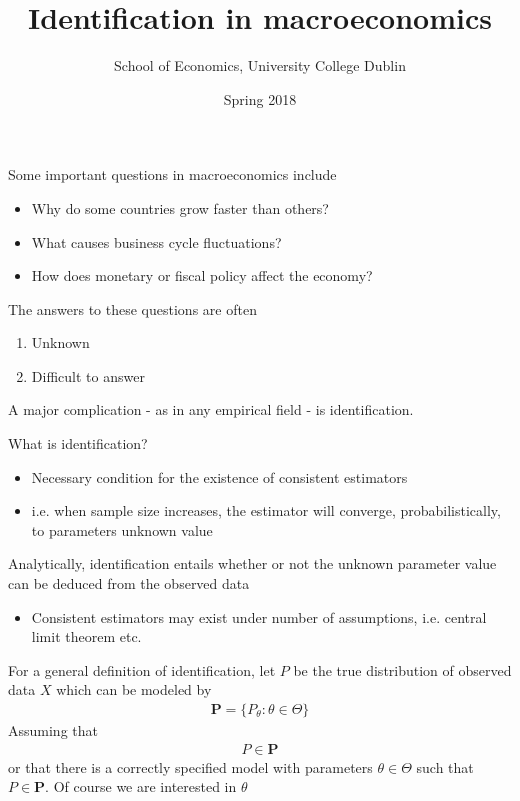 \documentclass{beamer}
\title{Identification in macroeconomics}
\author{School of Economics, University College Dublin}
\date{Spring 2018}
\begin{document}
\begin{frame}
 \titlepage
\end{frame}

\begin{frame}
  Some important questions in macroeconomics include
  \begin{itemize}
     \item Why do some countries grow faster than others?
     \medskip
     \item What causes business cycle fluctuations?
     \item How does monetary or fiscal policy affect the economy?
   \end{itemize} 
\end{frame}

\begin{frame}
  The answers to these questions are often 
  \begin{enumerate}
    \item Unknown
    \item Difficult to answer
  \end{enumerate}
  \medskip
  A major complication - as in any empirical field - is identification.
\end{frame}

\begin{frame}
  What is identification?
  \begin{itemize}
    \item Necessary condition for the existence of consistent estimators
    \item i.e. when sample size increases, the estimator will converge, probabilistically, to parameters unknown value
  \end{itemize}
  \medskip
  Analytically, identification entails whether or not the unknown parameter value can be deduced from the observed data
  \begin{itemize}
    \item Consistent estimators may exist under number of assumptions, i.e. central limit theorem etc.
  \end{itemize}
\end{frame}

\begin{frame}
 For a general definition of identification, let $P$ be the true distribution of observed data $X$ which can be modeled by
 \begin{align}
   \mathbf{P} = \{P_{\theta}: \theta \in \Theta  \}
 \end{align}
 Assuming that 
 \begin{align}
   P \in \mathbf{P}
 \end{align}
 or that there is a correctly specified model with parameters $\theta \in \Theta$ such that $P \in \mathbf{P}$.
 Of course we are interested in $\theta$  
\end{frame}
\end{document}
